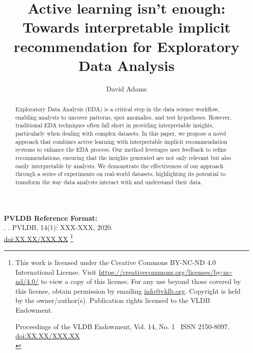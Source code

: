 \documentclass[sigconf, nonacm]{acmart}
\newcommand\vldbdoi{XX.XX/XXX.XX}
\newcommand\vldbpages{XXX-XXX}
\newcommand\vldbvolume{14}
\newcommand\vldbissue{1}
\newcommand\vldbyear{2020}
\newcommand\vldbauthors{\authors}
\newcommand\vldbtitle{\shorttitle}
\newcommand\vldbpagestyle{plain}
\begin{document}
\title{Active learning isn't enough: Towards interpretable implicit recommendation for Exploratory Data Analysis}

\author{David Adams}

\begin{abstract}
Exploratory Data Analysis (EDA) is a critical step in the data science workflow, enabling analysts to uncover patterns, spot anomalies, and test hypotheses. However, traditional EDA techniques often fall short in providing interpretable insights, particularly when dealing with complex datasets. In this paper, we propose a novel approach that combines active learning with interpretable implicit recommendation systems to enhance the EDA process. Our method leverages user feedback to refine recommendations, ensuring that the insights generated are not only relevant but also easily interpretable by analysts. We demonstrate the effectiveness of our approach through a series of experiments on real-world datasets, highlighting its potential to transform the way data analysts interact with and understand their data.
\end{abstract}

\maketitle

\pagestyle{\vldbpagestyle}
\begingroup\small\noindent\raggedright\textbf{PVLDB Reference Format:}\\
\vldbauthors. \vldbtitle. PVLDB, \vldbvolume(\vldbissue): \vldbpages, \vldbyear.\\
\href{https://doi.org/\vldbdoi}{doi:\vldbdoi}
\endgroup
\begingroup
\renewcommand\thefootnote{}\footnote{\noindent
This work is licensed under the Creative Commons BY-NC-ND 4.0 International License. Visit \url{https://creativecommons.org/licenses/by-nc-nd/4.0/} to view a copy of this license. For any use beyond those covered by this license, obtain permission by emailing \href{mailto:info@vldb.org}{info@vldb.org}. Copyright is held by the owner/author(s). Publication rights licensed to the VLDB Endowment. \\
\raggedright Proceedings of the VLDB Endowment, Vol. \vldbvolume, No. \vldbissue\ %
ISSN 2150-8097. \\
\href{https://doi.org/\vldbdoi}{doi:\vldbdoi} \\
}\addtocounter{footnote}{-1}\endgroup
\end{document}
